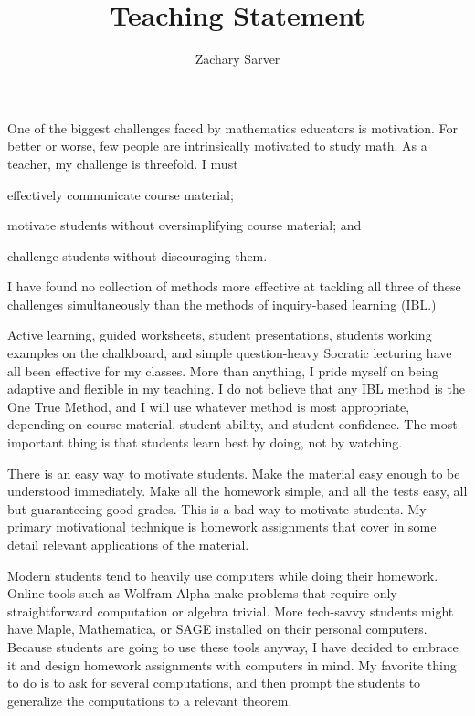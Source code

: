 \documentclass[11pt]{article}
\begin{document}
\fancyhf{}
\lhead[\thepage / \pageref{LastPage}]{Zachary Sarver}


\title{Teaching Statement}
\author{Zachary Sarver}
\date{}
\maketitle

One of the biggest challenges faced by mathematics educators is motivation. For
better or worse, few people are intrinsically motivated to study math. As a
teacher, my challenge is threefold. I must
\begin{inparaenum}
\item effectively communicate course material;
\item motivate students without oversimplifying course material; and
\item challenge students without discouraging them.
\end{inparaenum}
I have found no collection of methods more effective at tackling all three of
these challenges simultaneously than the methods of inquiry-based learning
(IBL.)

Active learning, guided worksheets, student presentations, students working
examples on the chalkboard, and simple question-heavy Socratic lecturing have
all been effective for my classes. More than anything, I pride myself on being
adaptive and flexible in my teaching. I do not believe that any IBL method is
the One True Method, and I will use whatever method is most appropriate,
depending on course material, student ability, and student confidence. The most
important thing is that students learn best by doing, not by watching.

There is an easy way to motivate students. Make the material easy enough to be
understood immediately. Make all the homework simple, and all the tests easy,
all but guaranteeing good grades. This is a bad way to motivate students. My
primary motivational technique is homework assignments that cover in some detail
relevant applications of the material. 

Modern students tend to heavily use computers while doing their homework. Online
tools such as Wolfram Alpha make problems that require only straightforward
computation or algebra trivial. More tech-savvy students might have Maple,
Mathematica, or SAGE installed on their personal computers. Because students are
going to use these tools anyway, I have decided to embrace it and design
homework assignments with computers in mind. My favorite thing to do is to ask
for several computations, and then prompt the students to generalize the
computations to a relevant theorem.
\end{document}
